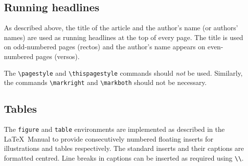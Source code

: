 \documentclass{jfp}
\begin{document}
\subsection{Running headlines}

As described above, the title of the article and the author's name (or authors'
names) are used as running headlines at the top of every page.
The title is used on odd-numbered pages (rectos) and the author's name appears
on even-numbered pages (versos).

The \verb"\pagestyle" and \verb"\thispagestyle" commands should {\em not\/} be
used.
Similarly, the commands \verb"\markright" and \verb"\markboth" should not be
necessary.


\subsection{Tables}

The {\tt figure} and {\tt table} environments are implemented as described in
the LaTeX\ Manual to
provide consecutively numbered floating inserts for illustrations and tables
respectively.
The standard inserts and their captions are formatted centred.
Line breaks in captions can be inserted as required using \verb"\\".
\end{document}
